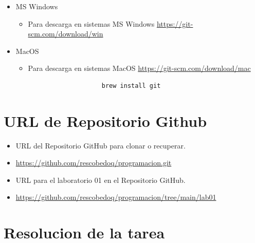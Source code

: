 \documentclass{article}
\begin{document}
\begin{itemize}
\begin{itemize}
\begin{itemize}
\begin{itemize}
\begin{lstlisting}
                apt-get install git    
                \end{lstlisting}
            \end{itemize}
            \item MS Windows
            \begin{itemize}
                \item Para descarga en sistemas MS Windows \url{https://git-scm.com/download/win}
            \end{itemize}
            \item MacOS
            \begin{itemize}
                \item Para descarga en sistemas MacOS \url{https://git-scm.com/download/mac}
                \begin{verbatim}
                    brew install git
                \end{verbatim}
            \end{itemize}
        \end{itemize}
	\end{itemize}
	
	\section{URL de Repositorio Github}
	\begin{itemize}
		\item URL del Repositorio GitHub para clonar o recuperar.
		\item \url{https://github.com/rescobedoq/programacion.git}
		\item URL para el laboratorio 01 en el Repositorio GitHub.
		\item \url{https://github.com/rescobedoq/programacion/tree/main/lab01}
	\end{itemize}
	
	\section{Resolucion de la tarea}
	

\end{itemize}
\end{document}

